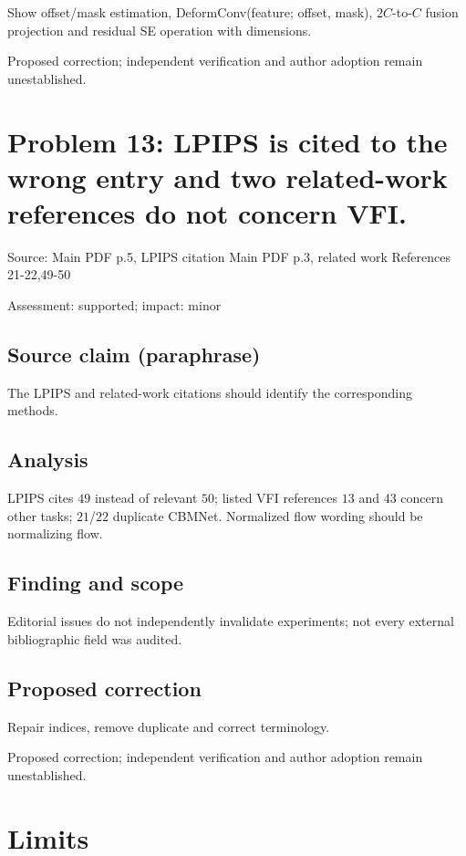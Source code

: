 \documentclass[11pt]{article}
\begin{document}
Show offset/mask estimation, DeformConv(feature; offset, mask), \(2C\)-to-\(C\) fusion projection and residual SE operation with dimensions.

Proposed correction; independent verification and author adoption remain unestablished.

\section*{Problem 13: LPIPS is cited to the wrong entry and two related-work references do not concern VFI.}

Source: Main PDF p.5, LPIPS citation Main PDF p.3, related work References 21-22,49-50

Assessment: supported; impact: minor

\subsection*{Source claim (paraphrase)}

The LPIPS and related-work citations should identify the corresponding methods.

\subsection*{Analysis}

LPIPS cites \(49\) instead of relevant \(50\); listed VFI references \(13\) and \(43\) concern other tasks; \(21\)/\(22\) duplicate CBMNet. Normalized flow wording should be normalizing flow.

\subsection*{Finding and scope}

Editorial issues do not independently invalidate experiments; not every external bibliographic field was audited.

\subsection*{Proposed correction}

Repair indices, remove duplicate and correct terminology.

Proposed correction; independent verification and author adoption remain unestablished.

\section*{Limits}
\end{document}

